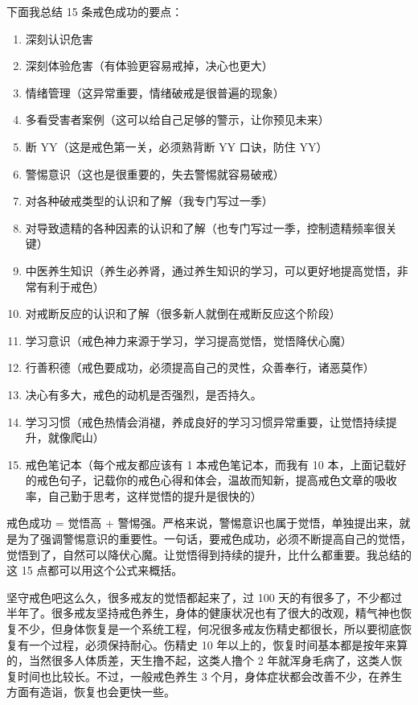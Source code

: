 \documentclass{ctexart}
\begin{document}
下面我总结 15 条戒色成功的要点：

\begin{enumerate}
    \item 深刻认识危害
    \item 深刻体验危害（有体验更容易戒掉，决心也更大）
    \item 情绪管理（这异常重要，情绪破戒是很普遍的现象）
    \item 多看受害者案例（这可以给自己足够的警示，让你预见未来）
    \item 断 YY（这是戒色第一关，必须熟背断 YY 口诀，防住 YY）
    \item 警惕意识（这也是很重要的，失去警惕就容易破戒）
    \item 对各种破戒类型的认识和了解（我专门写过一季）
    \item 对导致遗精的各种因素的认识和了解（也专门写过一季，控制遗精频率很关键）
    \item 中医养生知识（养生必养肾，通过养生知识的学习，可以更好地提高觉悟，非常有利于戒色）
    \item 对戒断反应的认识和了解（很多新人就倒在戒断反应这个阶段）
    \item 学习意识（戒色神力来源于学习，学习提高觉悟，觉悟降伏心魔）
    \item 行善积德（戒色要成功，必须提高自己的灵性，众善奉行，诸恶莫作）
    \item 决心有多大，戒色的动机是否强烈，是否持久。
    \item 学习习惯（戒色热情会消褪，养成良好的学习习惯异常重要，让觉悟持续提升，就像爬山）
    \item 戒色笔记本（每个戒友都应该有 1 本戒色笔记本，而我有 10 本，上面记载好的戒色句子，记载你的戒色心得和体会，温故而知新，提高戒色文章的吸收率，自己勤于思考，这样觉悟的提升是很快的）
\end{enumerate}

戒色成功 = 觉悟高 + 警惕强。严格来说，警惕意识也属于觉悟，单独提出来，就是为了强调警惕意识的重要性。一句话，要戒色成功，必须不断提高自己的觉悟，觉悟到了，自然可以降伏心魔。让觉悟得到持续的提升，比什么都重要。我总结的这 15 点都可以用这个公式来概括。

坚守戒色吧这么久，很多戒友的觉悟都起来了，过 100 天的有很多了，不少都过半年了。很多戒友坚持戒色养生，身体的健康状况也有了很大的改观，精气神也恢复不少，但身体恢复是一个系统工程，何况很多戒友伤精史都很长，所以要彻底恢复有一个过程，必须保持耐心。伤精史 10 年以上的，恢复时间基本都是按年来算的，当然很多人体质差，天生撸不起，这类人撸个 2 年就浑身毛病了，这类人恢复时间也比较长。不过，一般戒色养生 3 个月，身体症状都会改善不少，在养生方面有造诣，恢复也会更快一些。
\end{document}
